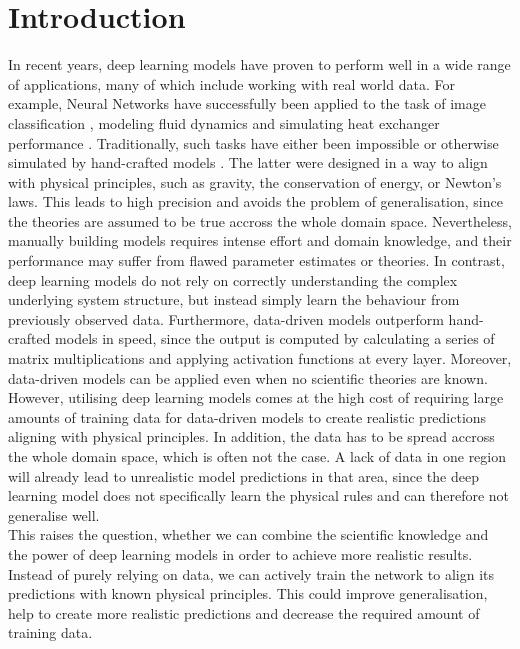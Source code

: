 \label{section:introduction}
\section{Introduction}

In recent years, deep learning models have proven to perform well in a wide range of applications, many of which include working with real world data. For example, Neural Networks have successfully been applied to the task of image classification \cite{NIPS2012_4824}, modeling fluid dynamics \cite{DBLP:journals/corr/SinghMD16} \cite{Tompson:2017:AEF:3305890.3306035} and simulating heat exchanger performance \cite{doi:10.1080/10789669.1999.10391233}. Traditionally, such tasks have either been impossible or otherwise simulated by hand-crafted models \cite{Cursi2005PhysicallyCN}. The latter were designed in a way to align with physical principles, such as gravity, the conservation of energy, or Newton's laws. This leads to high precision and avoids the problem of generalisation, since the theories are assumed to be true accross the whole domain space. Nevertheless, manually building models requires intense effort and domain knowledge, and their performance may suffer from flawed parameter estimates or theories. In contrast, deep learning models do not rely on correctly understanding the complex underlying system structure, but instead simply learn the behaviour from previously observed data. Furthermore, data-driven models outperform hand-crafted models in speed, since the output is computed by calculating a series of matrix multiplications and applying activation functions at every layer. Moreover, data-driven models can be applied even when no scientific theories are known. However, utilising deep learning models comes at the high cost of requiring large amounts of training data for data-driven models to create realistic predictions aligning with physical principles. In addition, the data has to be spread accross the whole domain space, which is often not the case. A lack of data in one region will already lead to unrealistic model predictions in that area, since the deep learning model does not specifically learn the physical rules and can therefore not generalise well.\\
\indent This raises the question, whether we can combine the scientific knowledge and the power of deep learning models in order to achieve more realistic results. Instead of purely relying on data, we can actively train the network to align its predictions with known physical principles. This could improve generalisation, help to create more realistic predictions and decrease the required amount of training data.\\

\clearpage

